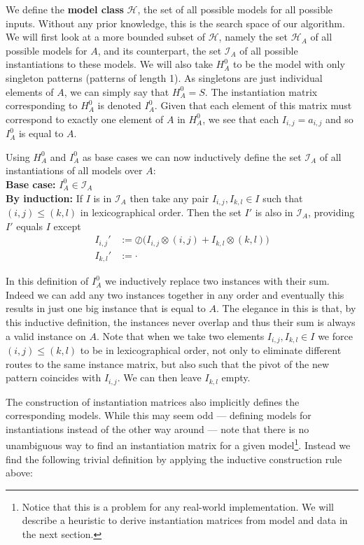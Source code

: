 \documentclass{llncs}
\begin{document}
We define the \textbf{model class} $\mathcal{H}$, the set of all possible models for all possible inputs. Without any prior knowledge, this is the search space of our algorithm. We will first look at a more bounded subset of $\mathcal{H}$, namely the set $\mathcal{H}_A$ of all possible models for $A$, and its counterpart, the set $\mathcal{I}_A$ of all possible instantiations to these models. We will also take $H_A^0$ to be the model with only singleton patterns (patterns of length 1). As singletons are just individual elements of $A$, we can simply say that $H_A^0=S$. The instantiation matrix corresponding to $H_A^0$ is denoted ${I}_A^0$. Given that each element of this matrix must correspond to exactly one element of $A$ in $H_A^0$, we see that each ${I}_{i,j} = a_{i,j}$ and so ${I}_A^0$ is equal to $A$. 

Using $H_A^0$ and ${I}_A^0$ as base cases we can now inductively define the set $\mathcal{I}_A$ of all instantiations of all models over $A$:\\
\textbf{Base case:} ${I}_A^0 \in \mathcal{I}_A$\\
\textbf{By induction:} If ${I}$ is in $\mathcal{I}_A$ then take any pair ${I}_{i,j},{I}_{k,l} \in {I}$ such that $(i,j)\leq(k,l)$ in lexicographical order. Then the set ${I}'$ is also in $\mathcal{I}_A$, providing ${I}'$ equals ${I}$ except
\begin{align*}
{I}_{i,j}' &:= \oslash \big( {I}_{i,j} \otimes (i,j) + {I}_{k,l} \otimes (k,l) \big) \\
{I}_{k,l}' &:= \cdot %
\end{align*}

In this definition of ${I}_A^0$ we inductively replace two instances with their sum. Indeed we can add any two instances together in any order and eventually this results in just one big instance that is equal to $A$. The elegance in this is that, by this inductive definition, the instances never overlap and thus their sum is always a valid instance on $A$. Note that when we take two elements ${I}_{i,j},{I}_{k,l} \in {I}$ we force $(i,j)\leq(k,l)$ to be in lexicographical order, not only to eliminate different routes to the same instance matrix, but also such that the pivot of the new pattern coincides with ${I}_{i,j}$. We can then leave ${I}_{k,l}$ empty.

The construction of instantiation matrices also implicitly defines the corresponding models. While this may seem odd --- defining models for instantiations instead of the other way around --- note that there is no unambiguous way to find an instantiation matrix for a given model\footnote{Notice that this is a problem for any real-world implementation. We will describe a heuristic to derive instantiation matrices from model and data in the next section.}. Instead we find the following trivial definition by applying the inductive construction rule above:
\end{document}
